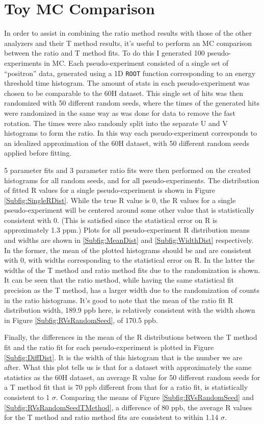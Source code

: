 \clearpage

\section{Toy MC Comparison}


In order to assist in combining the ratio method results with those of the other analyzers and their T method results, it's useful to perform an MC comparison between the ratio and T method fits. To do this I generated 100 pseudo-experiments in MC. Each pseudo-experiment consisted of a single set of ``positron'' data, generated using a 1D \texttt{ROOT} function corresponding to an energy threshold time histogram. The amount of stats in each pseudo-experiment was chosen to be comparable to the 60H dataset. This single set of hits was then randomized with 50 different random seeds, where the times of the generated hits were randomized in the same way as was done for data to remove the fast rotation. The times were also randomly split into the separate U and V histograms to form the ratio. In this way each pseudo-experiment corresponds to an idealized approximation of the 60H dataset, with 50 different random seeds applied before fitting.

5 parameter fits and 3 parameter ratio fits were then performed on the created histograms for all random seeds, and for all pseudo-experiments. The distribution of fitted R values for a single pseudo-experiment is shown in Figure \ref{Subfig:SingleRDist}. While the true R value is 0, the R values for a single pseudo-experiment will be centered around some other value that is statistically consistent with 0. (This is satisfied since the statistical error on R is approximately 1.3 ppm.) Plots for all pseudo-experiment R distribution means and widths are shown in \ref{Subfig:MeanDist} and \ref{Subfig:WidthDist} respectively. In the former, the mean of the plotted histograms should be and are consistent with 0, with widths corresponding to the statistical error on R. In the latter the widths of the T method and ratio method fits due to the randomization is shown. It can be seen that the ratio method, while having the same statistical fit precision as the T method, has a larger width due to the randomization of counts in the ratio histograms. It's good to note that the mean of the ratio fit R distribution width, 189.9 ppb here, is relatively consistent with the width shown in Figure \ref{Subfig:RVsRandomSeed}, of 170.5 ppb.

Finally, the differences in the mean of the R distributions between the T method fit and the ratio fit for each pseudo-experiment is plotted in Figure \ref{Subfig:DiffDist}. It is the width of this histogram that is the number we are after. What this plot tells us is that for a dataset with approximately the same statistics as the 60H dataset, an average R value for 50 different random seeds for a T method fit that is 70 ppb different from that for a ratio fit, is statistically consistent to 1 $\sigma$. Comparing the means of Figure \ref{Subfig:RVsRandomSeed} and \ref{Subfig:RVsRandomSeedTMethod}, a difference of 80 ppb, the average R values for the T method and ratio method fits are consistent to within 1.14 $\sigma$.

